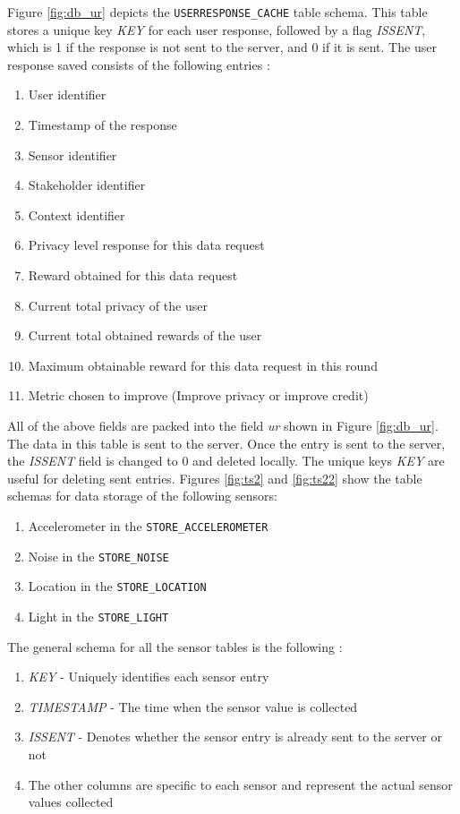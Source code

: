 Figure \ref{fig:db_ur} depicts the \texttt{USERRESPONSE\_CACHE} table schema. This table stores a unique key \textit{KEY} for each user response, followed by a flag \textit{ISSENT}, which is 1 if the response is not sent to the server, and 0 if it is sent. The user response saved consists of the following entries :

\begin{enumerate}
	\item User identifier
	\item Timestamp of the response
    \item Sensor identifier
    \item Stakeholder identifier
    \item Context identifier
    \item Privacy level response for this data request
    \item Reward obtained for this data request
    \item Current total privacy of the user
    \item Current total obtained rewards of the user
    \item Maximum obtainable reward for this data request in this round
    \item Metric chosen to improve  (Improve privacy or improve credit)
\end{enumerate}

All of the above fields are packed into the field \textit{ur} shown in Figure \ref{fig:db_ur}. The data in this table is sent to the server. Once the entry is sent to the server, the \textit{ISSENT} field is changed to 0 and deleted locally. The unique keys \textit{KEY} are useful for deleting sent entries. Figures \ref{fig:ts2} and \ref{fig:ts22} show the table schemas for data storage of the following sensors:

\begin{enumerate}
	\item Accelerometer in the \texttt{STORE\_ACCELEROMETER}
	\item Noise in the \texttt{STORE\_NOISE}
    \item Location in the  \texttt{STORE\_LOCATION}
    \item Light in the  \texttt{STORE\_LIGHT}
\end{enumerate}

The general schema for all the sensor tables is the following :

\begin{enumerate}
	\item \textit{KEY} - Uniquely identifies each sensor entry
	\item \textit{TIMESTAMP} - The time when the sensor value is collected
    \item \textit{ISSENT} - Denotes whether the sensor entry is already sent to the server or not
    \item The other columns are specific to each sensor and represent the actual sensor values collected 
\end{enumerate}

